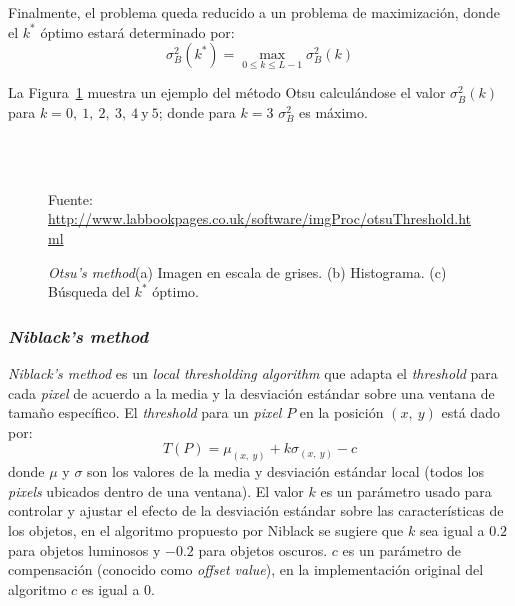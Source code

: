 Finalmente, el problema queda reducido a un problema de maximización, donde el
$k^*$ óptimo estará determinado por:
\begin{equation}
  \sigma_B^2(k^*) = \max_{0 \leq k \leq L - 1} \sigma_B^2 (k)
\end{equation}

La Figura~\ref{Fig:Cap-marcoteorico:otsu} muestra un ejemplo del método Otsu 
calculándose el valor $\sigma_B^2(k)$ para
$k = 0,~ 1,~ 2,~ 3,~ 4~ \text{y}~5$; donde para $k=3$ $\sigma_B^2$ es máximo.

\begin{figure}[h!]
	\centering
   { }
   \\
   \\
	\caption[\textit{Otsu's method}]{\textit{Otsu's method}(a) Imagen en escala 
	de grises. (b) Histograma. (c) Búsqueda del $k^*$ óptimo.} \tiny{Fuente:
	\url{http://www.labbookpages.co.uk/software/imgProc/otsuThreshold.html}}
	\label{Fig:Cap-marcoteorico:otsu}
\end{figure}

\subsubsection{\textit{Niblack's method}}
	\textit{Niblack's method}\cite{Niblack:1985:IDI} es un \textit{local 
	thresholding algorithm} que adapta el \textit{threshold} para cada
	\textit{pixel} de acuerdo a la media y la desviación estándar sobre una 
	ventana de tamaño específico. 
	El \textit{threshold} para un \textit{pixel} $P$ en la posición $(x, ~y)$ 
	está dado por:
	\begin{equation}
		T(P) = \mu_{(x,~y)} + k \sigma_{(x, ~y)} - c
	\end{equation}
	donde $\mu$ y $\sigma$ son los valores de la media y desviación estándar 
	local (todos los \textit{pixels} ubicados dentro de una ventana). El valor 
	$k$ es un parámetro usado para controlar y ajustar el efecto de la 
	desviación estándar sobre las características de los objetos, en el 
	algoritmo propuesto por Niblack se sugiere que $k$ sea igual a $0.2$ para
	objetos luminosos y $-0.2$ para objetos oscuros. $c$ es un parámetro de 
	compensación (conocido como \textit{offset value}), en la implementación 
	original del algoritmo $c$ es igual a $0$. 
	

